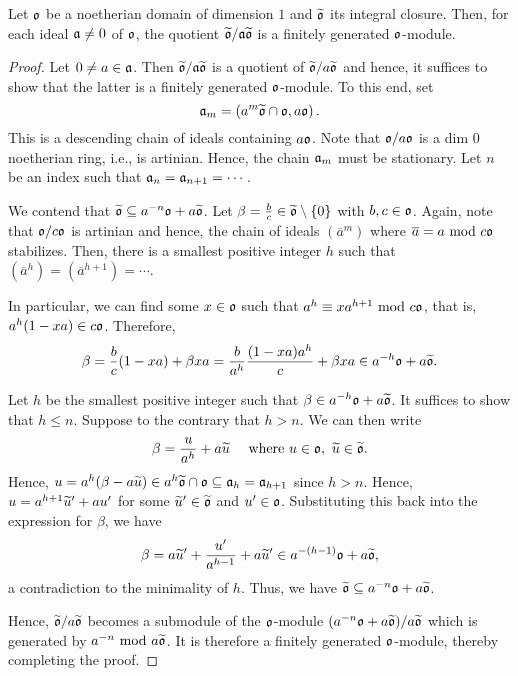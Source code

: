 \begin{lemma}
    Let $\mathfrak{o}$ be a noetherian domain of dimension $1$ and $\widetilde{\mathfrak{o}}$ its integral closure. Then, for each ideal $\mathfrak{a}\ne 0$ of $\mathfrak{o}$, the quotient $\widetilde{\mathfrak{o}}/\mathfrak{a}\widetilde{\mathfrak{o}}$ is a finitely generated $\mathfrak{o}$-module.
\end{lemma}
\begin{proof}
    Let $0\ne a\in\mathfrak{a}$. Then $\widetilde{\mathfrak{o}}/\mathfrak{a}\widetilde{\mathfrak{o}}$ is a quotient of $\widetilde{\mathfrak{o}}/a\widetilde{\mathfrak{o}}$ and hence, it suffices to show that the latter is a finitely generated $\mathfrak{o}$-module. To this end, set 
    \begin{equation*}
        \mathfrak{a}_m = \left(a^m\widetilde{\mathfrak{o}}\cap\mathfrak{o}, a\mathfrak{o}\right).
    \end{equation*}
    This is a descending chain of ideals containing $a\mathfrak{o}$. Note that $\mathfrak{o}/a\mathfrak{o}$ is a dim $0$ noetherian ring, i.e., is artinian. Hence, the chain $\mathfrak{a}_m$ must be stationary. Let $n$ be an index such that $\mathfrak{a}_n = \mathfrak{a}_{n + 1} = \cdots$.

    We contend that $\widetilde{\mathfrak{o}}\subseteq a^{-n}\mathfrak{o} + a\widetilde{\mathfrak{o}}$. Let $\beta = \frac{b}{c}\in\widetilde{\mathfrak{o}}\setminus\{0\}$ with $b,c\in\mathfrak{o}$. Again, note that $\mathfrak{o}/c\mathfrak{o}$ is artinian and hence, the chain of ideals $(\overline a^m)$ where $\overline a = a~\mathrm{mod}~ c\mathfrak{o}$ stabilizes. Then, there is a smallest positive integer $h$ such that $(\overline a^h) = (\overline a^{h + 1}) = \cdots$.

    In particular, we can find some $x\in\mathfrak{o}$ such that $a^h\equiv xa^{h + 1}~\mathrm{mod}~ c\mathfrak{o}$, that is, $a^h(1 - xa)\in c\mathfrak{o}$. Therefore, 
    \begin{equation*}
        \beta = \frac{b}{c}(1 - xa) + \beta xa = \frac{b}{a^h}\frac{(1 - xa)a^h}{c} + \beta xa\in a^{-h}\mathfrak{o} + a\widetilde{\mathfrak{o}}.
    \end{equation*}

    Let $h$ be the smallest positive integer such that $\beta\in a^{-h}\mathfrak{o} + a\widetilde{\mathfrak{o}}$. It suffices to show that $h\le n$. Suppose to the contrary that $h > n$. We can then write 
    \begin{equation*}
        \beta = \frac{u}{a^h} + a\widetilde{u}\quad\text{ where } u\in\mathfrak{o},~\widetilde{u}\in\widetilde{\mathfrak{o}}.
    \end{equation*}
    Hence, $u = a^h(\beta - a\widetilde{u})\in a^h\widetilde{\mathfrak{o}}\cap\mathfrak{o}\subseteq\mathfrak{a}_h = \mathfrak{a}_{h + 1}$ since $h > n$. Hence, $u = a^{h + 1}\widetilde{u}' + au'$ for some $\widetilde{u}'\in\widetilde{\mathfrak{o}}$ and $u'\in\mathfrak{o}$. Substituting this back into the expression for $\beta$, we have 
    \begin{equation*}
        \beta = a\widetilde{u}' + \frac{u'}{a^{h - 1}} + a\widetilde{u}'\in a^{-(h - 1)}\mathfrak{o} + a\widetilde{\mathfrak{o}},
    \end{equation*}
    a contradiction to the minimality of $h$. Thus, we have $\widetilde{\mathfrak{o}}\subseteq a^{-n}\mathfrak{o} + a\widetilde{\mathfrak{o}}$.

    Hence, $\widetilde{\mathfrak{o}}/a\widetilde{\mathfrak{o}}$ becomes a submodule of the $\mathfrak{o}$-module $(a^{-n}\mathfrak{o} + a\widetilde{\mathfrak{o}})/a\widetilde{\mathfrak{o}}$ which is generated by $a^{-n}~\mathrm{mod}~ a\widetilde{\mathfrak{o}}$. It is therefore a finitely generated $\mathfrak{o}$-module, thereby completing the proof.
\end{proof}

